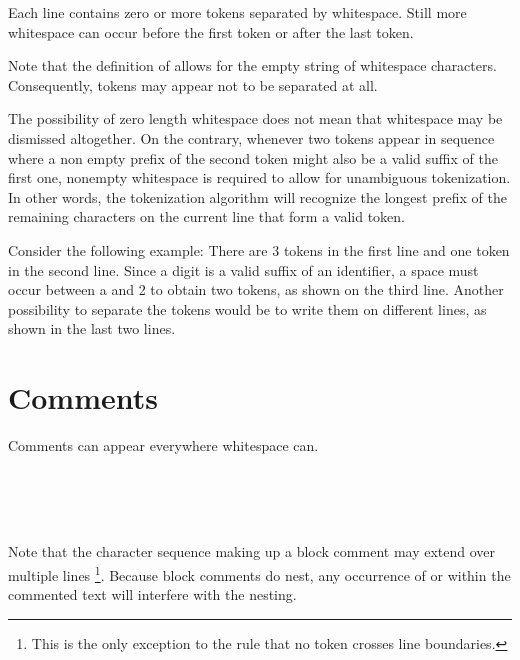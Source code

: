 Each line contains zero or more tokens separated by whitespace. Still
more whitespace can occur before the first token or after the last
token.

Note that the definition of  allows for the empty
string of whitespace characters. Consequently, tokens may appear not to
be separated at all.

The possibility of zero length whitespace does not mean that whitespace
may be dismissed altogether. On the contrary, whenever two tokens appear
in sequence where a non empty prefix of the second token might also be a
valid suffix of the first one, nonempty whitespace is required to allow
for unambiguous tokenization. In other words, the tokenization algorithm
will recognize the longest prefix of the remaining characters on the
current line that form a valid token.

Consider the following example:
There are 3 tokens in the first line and one token in the second line.
Since a digit is a valid suffix of an identifier, a space must occur
between a and 2 to obtain two tokens, as shown on the third line.
Another possibility to separate the tokens would be to write them on
different lines, as shown in the last two lines.

\section{Comments} 

Comments can appear everywhere whitespace can.

\begin{flushleft}
  \oder{} \\
  \\
 \regex{)*-$\backslash$\}}\\
\end{flushleft}

Note that the character sequence making up a block comment may extend over multiple lines
\footnote{This is the only exception to the rule that no token crosses line
boundaries.}. Because block comments do nest, any occurrence of  \regex{-\}} or \regex{\{-} within the
commented text will interfere with the nesting.

